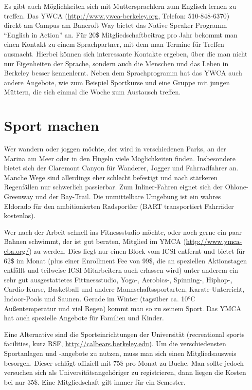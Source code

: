 \documentclass[a4paper]{scrreprt}
\begin{document}
Es gibt auch Möglichkeiten sich mit Muttersprachlern zum Englisch
lernen zu treffen. Das YWCA (\url{http://www.ywca-berkeley.org}, Telefon:
510-848-6370) direkt am Campus am Bancroft Way bietet das Native
Speaker Programm ``English in Action'' an. Für 20\$
Mitgliedschaftbeitrag pro Jahr bekommt man einen Kontakt zu einem
Sprachpartner, mit dem man Termine für Treffen ausmacht. Hierbei können
sich interessante Kontakte ergeben, über die man nicht nur Eigenheiten
der Sprache, sondern auch die Menschen und das Leben in Berkeley
besser kennenlernt. Neben dem Sprachprogramm hat das YWCA auch
andere Angebote, wie zum Beispiel Sportkurse und eine Gruppe mit
jungen Müttern, die sich einmal die Woche zum Austausch treffen. 

\section{Sport machen}

Wer wandern oder joggen möchte, der wird in verschiedenen Parks, an
der Marina am Meer oder in den Hügeln viele Möglichkeiten
finden. Insbesondere bietet sich der Claremont Canyon für Wanderer,
Jogger und Fahrradfahrer an. Manche Wege sind allerdings eher schlecht
befestigt und nach stärkeren Regenfällen nur schwerlich
passierbar. Zum Inliner-Fahren eignet sich der Ohlone-Greenway und der
Bay-Trail. Die unmittelbare Umgebung ist ein wahres Eldorado für den
ambitionierten Radsportler (BART transportiert Fahrräder kostenlos).

Wer nach der Arbeit schnell ins Fitnessstudio möchte, oder noch gerne
ein paar Bahnen schwimmt, der ist gut beraten, Mitglied im YMCA
(\url{http://www.ymca-cba.org/}) zu werden. Dies liegt nur einen Block
vom ICSI entfernt und bietet für 62\$ im Monat (plus einer Enrollment
Fee von 99\$, die an speziellen Aktionstagen entfällt und teilweise
ICSI-Mitarbeitern auch erlassen wird) unter anderem ein sehr gut
ausgestattetes Fittnessstudio, Yoga-, Aerobics-, Spinning-, Hiphop-,
Cardio-Kurse, Basketball und andere Mannschaftssportarten,
Karate-Unterricht, Indoor-Pools und Saunen. Gerade im Winter (tagsüber
ca. 10°C Außentemperatur und viel Regen) kommt man so zu seinem
Sport. Das YMCA hat auch spezielle Angebote für Familien und Kinder. 

Eine Alternative sind die Sporteinrichtungen der Universität
(recreational sports facilities, kurz RSF,
\url{http://calbears.berkeley.edu}). Um die verschiedensten
Sportanlagen und -angebote zu nutzen, muss man sich einen
Mitgliedsausweis besorgen. Dieser schlägt offiziell mit 75\$ pro
Monat zu Buche. Man sollte jedoch versuchen sich als
Universitätsangehöriger zu registrieren, dann liegen die Kosten bei
nur 35\$. Eine Mitgliedschaft gilt immer für ein Semester.
\end{document}
